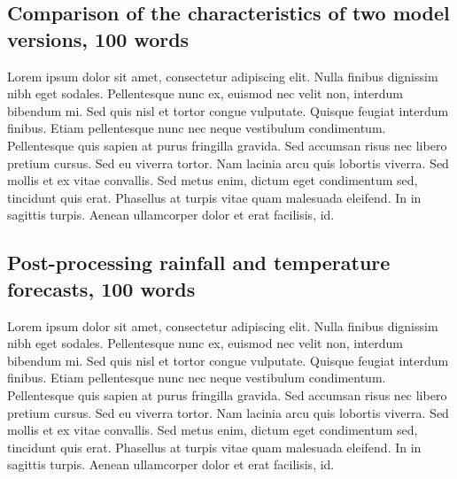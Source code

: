 \documentclass[techmemo]{ecmwfrep}%
\begin{document}
\subsection{Comparison of the characteristics of two model versions, 100 words}
Lorem ipsum dolor sit amet, consectetur adipiscing elit. Nulla finibus dignissim nibh eget sodales. Pellentesque nunc ex, euismod nec velit non, interdum bibendum mi. Sed quis nisl et tortor congue vulputate. Quisque feugiat interdum finibus. Etiam pellentesque nunc nec neque vestibulum condimentum. Pellentesque quis sapien at purus fringilla gravida. Sed accumsan risus nec libero pretium cursus. Sed eu viverra tortor. Nam lacinia arcu quis lobortis viverra. Sed mollis et ex vitae convallis. Sed metus enim, dictum eget condimentum sed, tincidunt quis erat. Phasellus at turpis vitae quam malesuada eleifend. In in sagittis turpis. Aenean ullamcorper dolor et erat facilisis, id.

\subsection{Post-processing rainfall and temperature forecasts, 100 words}
Lorem ipsum dolor sit amet, consectetur adipiscing elit. Nulla finibus dignissim nibh eget sodales. Pellentesque nunc ex, euismod nec velit non, interdum bibendum mi. Sed quis nisl et tortor congue vulputate. Quisque feugiat interdum finibus. Etiam pellentesque nunc nec neque vestibulum condimentum. Pellentesque quis sapien at purus fringilla gravida. Sed accumsan risus nec libero pretium cursus. Sed eu viverra tortor. Nam lacinia arcu quis lobortis viverra. Sed mollis et ex vitae convallis. Sed metus enim, dictum eget condimentum sed, tincidunt quis erat. Phasellus at turpis vitae quam malesuada eleifend. In in sagittis turpis. Aenean ullamcorper dolor et erat facilisis, id.

\end{document}
